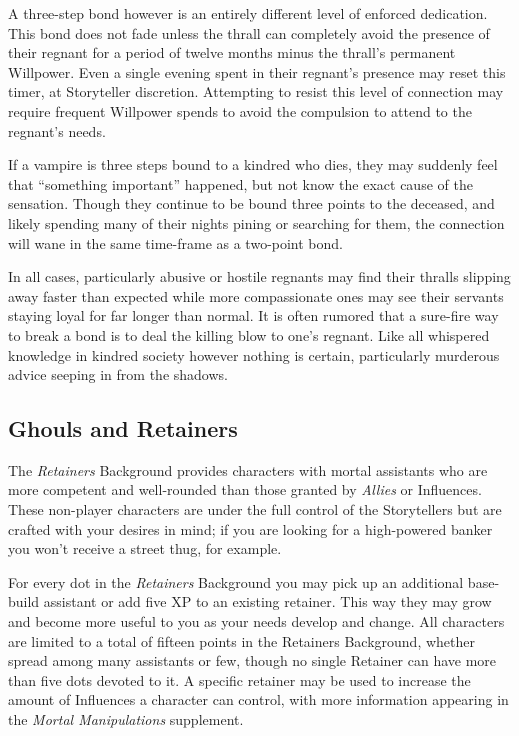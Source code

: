 A three-step bond however is an entirely different level of enforced dedication.  This bond does 
not fade unless the thrall can completely avoid the presence of their regnant for a period of 
twelve months minus the thrall's permanent Willpower.  Even a single evening spent in their 
regnant's presence may reset this timer, at Storyteller discretion.  Attempting to resist this 
level of connection may require frequent Willpower spends to avoid the compulsion to attend to 
the regnant's needs.

If a vampire is three steps bound to a kindred who dies, they may suddenly feel that 
``something important'' happened, but not know the exact cause of the sensation.  Though 
they continue to be bound three points to the deceased, and likely spending many of their 
nights pining or searching for them, the connection will wane in the same time-frame as a two-point 
bond.

In all cases, particularly abusive or hostile regnants may find their thralls slipping away faster 
than expected while more compassionate ones may see their servants staying loyal for far longer than 
normal.  It is often rumored that a sure-fire way to break a bond is to deal the killing blow to one's 
regnant.  Like all whispered knowledge in kindred society however nothing is certain, particularly 
murderous advice seeping in from the shadows.

\subsection{Ghouls and Retainers}
\label{subsec:ghouls}
The \emph{Retainers} Background provides characters with mortal assistants who are more 
competent and well-rounded than those granted by \emph{Allies} or Influences.  These 
non-player characters are under the full control of the Storytellers but are crafted with 
your desires in mind; if you are looking for a high-powered banker you won't receive a 
street thug, for example.

For every dot in the \emph{Retainers} Background you may pick up an additional base-build 
assistant or add five XP to an existing retainer.  This way they may grow and become more 
useful to you as your needs develop and change.  All characters are limited to a total of 
fifteen points in the Retainers Background, whether spread among many assistants or few, though 
no single Retainer can have more than five dots devoted to it.  A specific retainer may be used 
to increase the amount of Influences a character can control, with more information appearing in 
the \emph{Mortal Manipulations} supplement.

